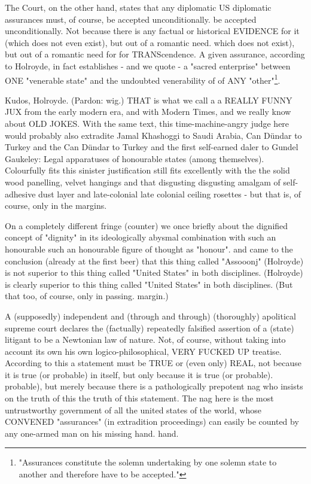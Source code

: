 \begin{multicols}{2}
The Court, on the other hand, states that any diplomatic
US diplomatic assurances must, of course, be accepted unconditionally.
be accepted unconditionally. Not because there is any factual or historical EVIDENCE for it (which does not even exist), but out of a romantic need.
which does not exist), but out of a romantic need for
for TRANScendence. A given assurance, according to Holroyde, in fact establishes - and we quote - a
"sacred enterprise" between ONE "venerable state" and the undoubted venerability of 
of ANY "other"\footnote[32]{"Assurances constitute the solemn undertaking by one solemn state to another and therefore have to be accepted."}.

Kudos, Holroyde. (Pardon: wig.) THAT is what we call a
a REALLY FUNNY JUX from the early modern era, and with
Modern Times, and we really know about OLD JOKES. With the same text, this time-machine-angry judge here would probably also extradite
Jamal Khashoggi to Saudi Arabia, Can Dündar to Turkey and the
Can Dündar to Turkey and the first self-earned daler to
Gundel Gaukeley: Legal apparatuses
of honourable states (among themselves). Colourfully fits
this sinister justification still fits excellently with the
the solid wood panelling, velvet hangings and that disgusting
disgusting amalgam of self-adhesive dust layer and late-colonial
late colonial ceiling rosettes - but that is, of course, only
in the margins.

On a completely different fringe (counter) we once briefly
about the dignified concept of "dignity" in its ideologically abysmal combination with such an honourable
such an honourable figure of thought as "honour".
and came to the conclusion (already at the first beer) that this thing called "Assooonj" (Holroyde) is not superior to this thing called "United States" in both disciplines.
(Holroyde) is clearly superior to this thing called "United States" in both disciplines. (But that too, of course, only in passing.
margin.)

A (supposedly) independent and (through and through)
(thoroughly) apolitical supreme court declares the (factually) repeatedly falsified assertion of a (state) litigant to be a Newtonian law of nature. Not, of course, without taking into account its own
his own logico-philosophical, VERY FUCKED UP treatise. According to this
a statement must be TRUE or (even only) REAL, not because it is true (or probable) in itself, but only because it is true (or probable).
probable), but merely because there is a pathologically prepotent nag who insists on the truth of this
the truth of this statement. The
nag here is the most untrustworthy government of all the united states of the world, whose CONVENED
"assurances" (in extradition proceedings) can easily be counted by any one-armed man on his missing hand.
hand.


\end{multicols}
